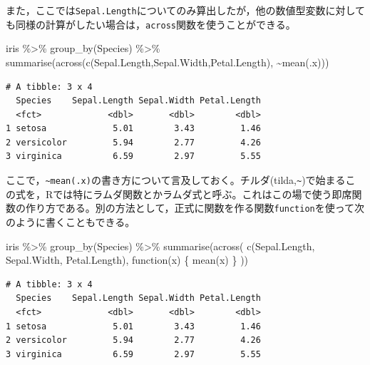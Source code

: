 \documentclass[
  a4paper,
]{ltjsbook}
\newenvironment{Shaded}{\begin{snugshade}}{\end{snugshade}}
\newcommand{\ControlFlowTok}[1]{\textcolor[rgb]{0.00,0.23,0.31}{#1}}
\newcommand{\FunctionTok}[1]{\textcolor[rgb]{0.28,0.35,0.67}{#1}}
\newcommand{\NormalTok}[1]{\textcolor[rgb]{0.00,0.23,0.31}{#1}}
\newcommand{\SpecialCharTok}[1]{\textcolor[rgb]{0.37,0.37,0.37}{#1}}
\begin{document}
また，ここでは\texttt{Sepal.Length}についてのみ算出したが，他の数値型変数に対しても同様の計算がしたい場合は，\texttt{across}関数を使うことができる。

\begin{Shaded}
\begin{Highlighting}[]
\NormalTok{iris }\SpecialCharTok{\%\textgreater{}\%} 
  \FunctionTok{group\_by}\NormalTok{(Species) }\SpecialCharTok{\%\textgreater{}\%} 
  \FunctionTok{summarise}\NormalTok{(}\FunctionTok{across}\NormalTok{(}\FunctionTok{c}\NormalTok{(Sepal.Length,Sepal.Width,Petal.Length),}
  \SpecialCharTok{\textasciitilde{}}\FunctionTok{mean}\NormalTok{(.x)))}
\end{Highlighting}
\end{Shaded}

\begin{verbatim}
# A tibble: 3 x 4
  Species    Sepal.Length Sepal.Width Petal.Length
  <fct>             <dbl>       <dbl>        <dbl>
1 setosa             5.01        3.43         1.46
2 versicolor         5.94        2.77         4.26
3 virginica          6.59        2.97         5.55
\end{verbatim}

ここで，\texttt{\textasciitilde{}mean(.x)}の書き方について言及しておく。チルダ(tilda,\texttt{\textasciitilde{}})で始まるこの式を，Rでは特にラムダ関数とかラムダ式と呼ぶ。これはこの場で使う即席関数の作り方である。別の方法として，正式に関数を作る関数\texttt{function}を使って次のように書くこともできる。

\begin{Shaded}
\begin{Highlighting}[]
\NormalTok{iris }\SpecialCharTok{\%\textgreater{}\%}
    \FunctionTok{group\_by}\NormalTok{(Species) }\SpecialCharTok{\%\textgreater{}\%}
    \FunctionTok{summarise}\NormalTok{(}\FunctionTok{across}\NormalTok{(}
        \FunctionTok{c}\NormalTok{(Sepal.Length, Sepal.Width, Petal.Length),}
        \ControlFlowTok{function}\NormalTok{(x) \{}
            \FunctionTok{mean}\NormalTok{(x)}
\NormalTok{        \}}
\NormalTok{    ))}
\end{Highlighting}
\end{Shaded}

\begin{verbatim}
# A tibble: 3 x 4
  Species    Sepal.Length Sepal.Width Petal.Length
  <fct>             <dbl>       <dbl>        <dbl>
1 setosa             5.01        3.43         1.46
2 versicolor         5.94        2.77         4.26
3 virginica          6.59        2.97         5.55
\end{verbatim}
\end{document}
